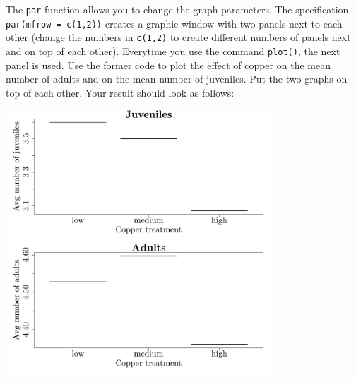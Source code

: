 \documentclass{article}\usepackage[]{graphicx}\usepackage[]{color}
\newenvironment{knitrout}{}{} %
\begin{document}
The \texttt{par} function allows you to change the graph parameters. The specification \texttt{par(mfrow = c(1,2))} creates a graphic window with two panels next to each other (change the numbers in \texttt{c(1,2)} to create different numbers of panels next and on top of each other). Everytime you use the command \texttt{plot()}, the next panel is used. Use the former code to plot the effect of copper on the mean number of adults and on the mean number of juveniles. Put the two graphs on top of each other. Your result should look as follows:
\begin{knitrout}
\color{fgcolor}

{\centering \includegraphics[width=0.75\textwidth]{figure/ploti3} 

}



\end{knitrout}
\end{document}

